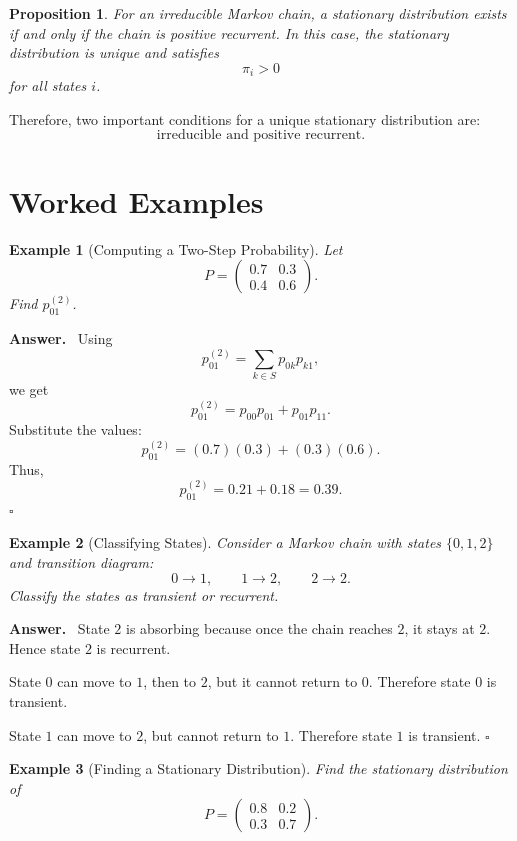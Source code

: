 \documentclass[12pt,a4paper]{article}
\theoremstyle{lecturestyle}
\newtheorem{example}{Example}
\newtheorem{proposition}{Proposition}
\newenvironment{answer}
{\par\textbf{Answer.}\ }
{\hfill$\square$\par}
\begin{document}
\begin{proposition}
For an irreducible Markov chain, a stationary distribution exists if and only if the chain is positive recurrent. In this case, the stationary distribution is unique and satisfies
\[
\pi_i>0
\]
for all states $i$.
\end{proposition}

Therefore, two important conditions for a unique stationary distribution are:
\[
\boxed{\text{irreducible and positive recurrent}.}
\]

\section{Worked Examples}

\begin{example}[Computing a Two-Step Probability]
Let
\[
P=
\begin{pmatrix}
0.7 & 0.3\\
0.4 & 0.6
\end{pmatrix}.
\]
Find $p_{01}^{(2)}$.
\end{example}

\begin{answer}
Using
\[
p_{01}^{(2)}=\sum_{k\in S}p_{0k}p_{k1},
\]
we get
\[
p_{01}^{(2)}
=p_{00}p_{01}+p_{01}p_{11}.
\]
Substitute the values:
\[
p_{01}^{(2)}
=(0.7)(0.3)+(0.3)(0.6).
\]
Thus,
\[
p_{01}^{(2)}
=0.21+0.18
=0.39.
\]
\end{answer}

\begin{example}[Classifying States]
Consider a Markov chain with states $\{0,1,2\}$ and transition diagram:
\[
0\to 1,\qquad 1\to 2,\qquad 2\to 2.
\]
Classify the states as transient or recurrent.
\end{example}

\begin{answer}
State $2$ is absorbing because once the chain reaches $2$, it stays at $2$. Hence state $2$ is recurrent.

State $0$ can move to $1$, then to $2$, but it cannot return to $0$. Therefore state $0$ is transient.

State $1$ can move to $2$, but cannot return to $1$. Therefore state $1$ is transient.
\end{answer}

\begin{example}[Finding a Stationary Distribution]
Find the stationary distribution of
\[
P=
\begin{pmatrix}
0.8 & 0.2\\
0.3 & 0.7
\end{pmatrix}.
\]
\end{example}
\end{document}
